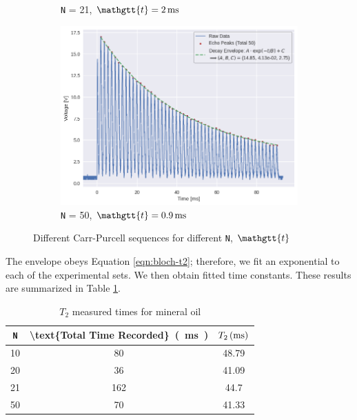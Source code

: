 \documentclass[
    floatfix,  %
    reprint,
    amsmath,amssymb,
    aps,
]{revtex4-2}
\newcommand{\taucode}{\mathgtt{t}}
\begin{document}
\begin{figure}[hbpt]
\begin{subfigure}{0.4\linewidth}
        \caption{\texttt{N} = 21, $\taucode = \SI{2}{\milli\second}$}
    \end{subfigure}
    \begin{subfigure}{0.4\linewidth}
        \includegraphics[width = 0.8\linewidth]{figs/purcell/data4.png}
        \caption{\texttt{N} = 50, $\taucode = \SI{0.9}{\milli\second}$}
    \end{subfigure}
    \caption{Different Carr-Purcell sequences for different \texttt{N}, $\taucode$}\label{fig:experimental-purcell}
\end{figure}


The envelope obeys Equation \ref{eqn:bloch-t2}; therefore, we fit an exponential to each of the experimental sets. We then obtain fitted time constants. These results are summarized in Table \ref{tab:t2-times}.

\begin{table}[htbp]
    \centering
    \caption{$T_2$ measured times for mineral oil}
    \begin{tabular}{|c|c|c|}
        \hline
        \texttt{N} & \SI[parse-numbers=false]{\text{Total Time Recorded}}{(\milli\second)} & $\SI[parse-numbers=false]{T_2}{(\milli\second)}$\\
        \hline
        10    & 80    & 48.79 \\
        \hline
        20    & 36    & 41.09 \\
        \hline
        21    & 162   & 44.7 \\
        \hline
        50    & 70    & 41.33 \\
        \hline
    \end{tabular}%
    \label{tab:t2-times}%
\end{table}%
\end{document}

